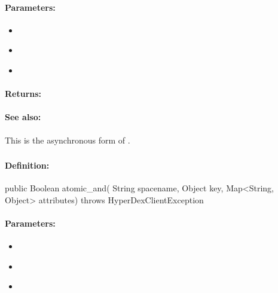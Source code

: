 \paragraph{Parameters:}
\begin{itemize}[noitemsep]
\item {}\\

\item {}\\

\item {}\\

\end{itemize}

\paragraph{Returns:}


\paragraph{See also:}  This is the asynchronous form of .

\pagebreak
\subsubsection{}
\label{api:java:atomic_and}


\paragraph{Definition:}
\begin{javacode}
public Boolean atomic_and(
        String spacename,
        Object key,
        Map<String, Object> attributes) throws HyperDexClientException
\end{javacode}

\paragraph{Parameters:}
\begin{itemize}[noitemsep]
\item {}\\

\item {}\\

\item {}\\

\end{itemize}

